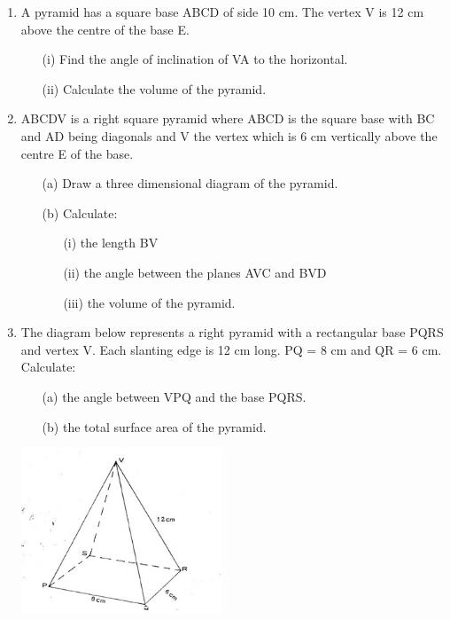 \begin{enumerate}
	\item A pyramid has a square base ABCD of side 10 cm. The vertex V is 12 cm above the centre of the base E.
		\begin{itemize}
		\item[(i)] Find the angle of inclination of VA to the horizontal.
		\item[(ii)] Calculate the volume of the pyramid.
		\end{itemize}
		
	\item ABCDV is a right square pyramid where ABCD is the square base with BC and AD being diagonals and V the vertex which is 6 cm vertically above the centre E of the base.
		\begin{itemize}
		\item[(a)] Draw a three dimensional diagram of the pyramid.
		\item[(b)] Calculate:
			\begin{itemize}
			\item[(i)] the length BV
			\item[(ii)] the angle between the planes AVC and BVD
			\item[(iii)] the volume of the pyramid.
			\end{itemize}
		\end{itemize}
		
	\item The diagram below represents a right pyramid with a rectangular base PQRS and vertex V. Each slanting edge is 12 cm long. PQ = 8 cm and QR = 6 cm. Calculate:
		\begin{itemize}
		\item[(a)] the angle between VPQ and the base PQRS.
		\item[(b)] the total surface area of the pyramid.
		\end{itemize}
	\begin{center}
	\includegraphics[width=6cm]{./img/3d6.jpg}
	\end{center}


\end{enumerate}
